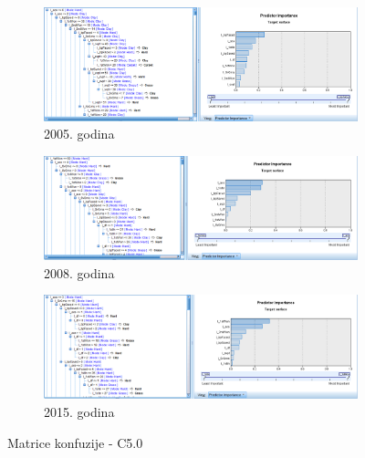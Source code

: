 \documentclass[a4paper]{article}
\begin{document}
\begin{figure}[H]
	\begin{subfigure}[h]{\textwidth}
		\begin{center}
			\includegraphics[scale=0.50]{Klasifikacija/C50/Model_Surface2005.png}
		\end{center}
		\caption{2005. godina}
		\label{fig:ModelKlasifikacijaC502005}
	\end{subfigure}
	
	\vspace{0.5cm}
	\begin{subfigure}[h]{\textwidth}
		\begin{center}
			\includegraphics[scale=0.50]{Klasifikacija/C50/Model_Surface2008.png}
		\end{center}
		\caption{2008. godina}
		\label{fig:ModelKlasifikacijaC502008}
	\end{subfigure}
	
	\vspace{0.5cm}
	\begin{subfigure}[h]{\textwidth}
		\begin{center}
			\includegraphics[scale=0.50]{Klasifikacija/C50/Model_Surface2015.png}
		\end{center}
		\caption{2015. godina}
		\label{fig:ModelKlasifikacijaC502015}
	\end{subfigure}
	
	\caption{Matrice konfuzije - C5.0}
	\label{fig:ModelKlasifikacijaC50}
\end{figure}
\end{document}
